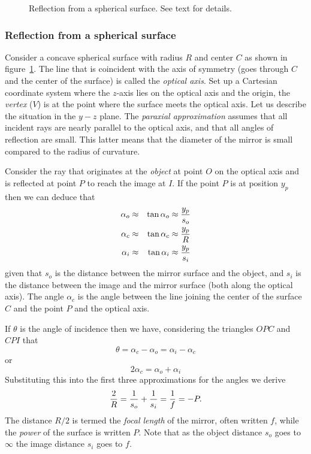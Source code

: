 \documentclass{article}
\newcommand{\bua}{\begin{eqnarray*}}
\newcommand{\eua}{\end{eqnarray*}}
\begin{document}
\begin{figure}[th]
  \hfil{}\hfil
  \caption{Reflection from a spherical surface. See text for details. }
  \label{fig:reflection_spherical}
\end{figure}

\subsubsection{Reflection from a spherical surface}

Consider a concave spherical surface with radius $R$ and center $C$ as
shown in figure~\ref{fig:reflection_spherical}. The line that is 
coincident with the axis of symmetry (goes through $C$ and the center of the surface)
is called the {\it optical axis}. Set up a Cartesian coordinate system where the $z$-axis
lies on the optical axis and the origin, the {\it vertex} ($V$) is at the point where the surface meets 
the optical axis. Let us describe the situation in the $y-z$ plane. The {\it paraxial approximation}
assumes that all incident rays are nearly parallel to the optical axis, and that all angles
of reflection are small. This latter means that the diameter of the mirror is small compared
to the radius of curvature. 

Consider the ray that originates at the {\it object} at point $O$ on the optical axis and is 
reflected at point $P$ to reach the image at $I$. If the point $P$ is at position $y_p$ then
we can deduce that 
\bua
\alpha_o&\approx&\tan\alpha_o\approx{y_p\over s_o} \\
\alpha_c&\approx&\tan\alpha_c\approx{y_p\over R} \\
\alpha_i&\approx&\tan\alpha_i\approx{y_p\over s_i} 
\eua
given that $s_o$ is the distance between the mirror surface and the object, and $s_i$ is the distance
between the image and the mirror surface (both along the optical axis). The angle $\alpha_c$ is the angle between the line joining the center of the surface $C$ and the point $P$ and the optical
axis.

If $\theta$ is the angle of incidence then we have, considering the triangles $OPC$ and $CPI$ 
that 
\[ 
\theta=\alpha_c-\alpha_o=\alpha_i-\alpha_c
\]
or
\[ 
2\alpha_c=\alpha_o+\alpha_i
\]
Substituting this into the first three approximations for the angles we derive
\[
{2\over R}={1\over s_o}+{1\over s_i}={1\over f}=-P.
\]
The distance $R/2$ is termed the {\it focal length} of the mirror, often written $f$, while
the {\it power} of the surface is written $P$. Note that as the object distance
$s_o$ goes to $\infty$ the image distance $s_i$ goes to $f$.
\end{document}

